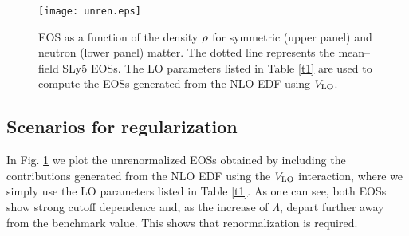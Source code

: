 \documentclass[aps,11pt,prc,preprint,superscriptaddress,nofootinbib]{revtex4}
\begin{document}
\begin{figure}[htbp]
\texttt{[image: unren.eps]}
\caption{EOS as a function of the density $\protect\rho $ 
for symmetric (upper panel) and neutron (lower panel) matter. The
dotted line represents the mean--field SLy5 EOSs. The LO parameters listed in Table \ref{t1} 
are used to compute the EOSs generated from the NLO EDF using $V_{\rm LO}$. }
\label{unren}
\end{figure}


\subsection{Scenarios for regularization}

In Fig. \ref{unren} we plot the unrenormalized EOSs obtained by including the contributions generated from the NLO EDF using the $V_{\rm LO}$ interaction, where we simply use the LO parameters listed in Table \ref{t1}. As one can see, both EOSs show strong cutoff dependence and, as the increase of $\Lambda$, depart further away from the benchmark value. This shows that renormalization is required.    
\end{document}
